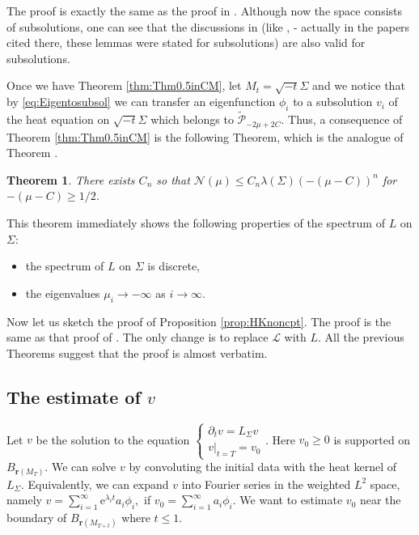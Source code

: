 \documentclass[12pt]{amsart}
\numberwithin{equation}{section}
\newtheorem{theorem}{Theorem}[section]
\numberwithin{equation}{section}
\newcommand{\cN}{\mathcal{N}}
\newcommand{\cL}{\mathcal{L}}
\begin{document}
	The proof is exactly the same as the proof in \cite{CM5}. Although now the space consists of subsolutions, one can see that the discussions in \cite{CM5} (like \cite[Lemma 3.4]{CM5}, \cite[Lemma 4.1]{CM5} - actually in the papers cited there, these lemmas were stated for subsolutions) are also valid for subsolutions. 
	
	Once we have Theorem \ref{thm:Thm0.5inCM}, let $M_t=\sqrt{-t}\Sigma$ and we notice that by \eqref{eq:Eigentosubsol} we can transfer an eigenfunction $\phi_i$ to a subsolution $v_i$ of the heat equation on $\sqrt{-t}\Sigma$ which belongs to $\tilde{\mathcal P}_{-2\mu+2C}$. Thus, a consequence of Theorem \ref{thm:Thm0.5inCM} is the following Theorem, which is the analogue of Theorem \cite[Theorem 0.7]{CM5}.
	
	\begin{theorem}
		There exists $C_n$ so that $	\cN(\mu)\leq C_n\lambda(\Sigma)(-(\mu-C))^n 
		$ for $-(\mu-C)\geq 1/2$.
	\end{theorem}
	This theorem immediately shows the following properties of the spectrum of $L$ on $\Sigma$:
	\begin{itemize}
		\item the spectrum of $L$ on $\Sigma$ is discrete,
		\item the eigenvalues $\mu_i\to -\infty$ as $i\to\infty$.
	\end{itemize}
	
	Now let us sketch the proof of Proposition \ref{prop:HKnoncpt}. The proof is the same as that proof of \cite[Theorem 5.3]{CM5}. The only change is to replace $\cL$ with $L$. All the previous Theorems suggest that the proof is almost verbatim.
	
	\subsection{The estimate of $v$}
	Let $v$ be the solution to the equation
	$\begin{cases}
		\partial_t v=L_\Sigma v\\
		v|_{t=T}=v_0
	\end{cases}$.
	Here $v_0\geq 0$ is supported on $B_{\mathbf{r}(M_T)}$. We can solve $v$ by convoluting the initial data with the heat kernel of $L_\Sigma$. Equivalently, we can expand $v$ into Fourier series in the weighted $L^2$ space, namely
	$v=\sum_{i=1}^\infty \mathrm{e}^{\lambda_i t}a_i \phi_i,$
	if
	$v_0=\sum_{i=1}^\infty a_i \phi_i.$ 
	We want to estimate $v_0$ near the boundary of $B_{\mathbf{r}(M_{T+t})}$ where $t\leq 1$. 
	
\end{document}

